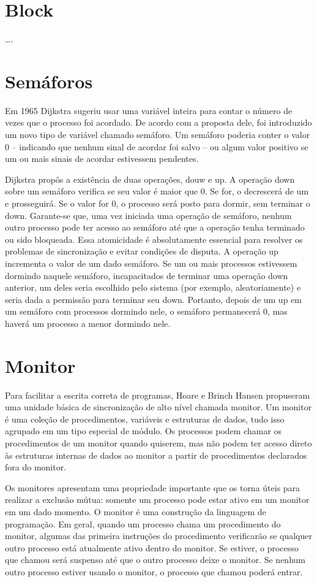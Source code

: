 \section{Block}
….


\section{Semáforos}

Em 1965 Dijkstra sugeriu usar uma variável inteira para contar o número de vezes que o processo foi acordado. De acordo com a proposta dele, foi introduzido um novo tipo de variável chamado semáforo. Um semáforo poderia conter o valor 0 – indicando que nenhum sinal de acordar foi salvo – ou algum valor positivo se um ou mais sinais de acordar estivessem pendentes.

Dijkstra propôs a existência de duas operações,  douw e up. A operação down sobre um semáforo verifica se seu valor é maior que 0. Se for, o decrescerá de um e prosseguirá. Se o valor for 0, o processo será posto para dormir, sem terminar o down. Garante-se que, uma vez iniciada uma operação de semáforo, nenhum outro processo pode ter acesso ao semáforo até que a operação tenha terminado ou sido bloqueada. Essa atomicidade é absolutamente essencial para resolver os problemas de sincronização e evitar condições de disputa.
A operação up incrementa o valor de um dado semáforo. Se um ou mais processos estivessem dormindo naquele semáforo, incapacitados de terminar uma operação down anterior, um deles seria escolhido pelo sistema (por exemplo, aleatoriamente) e seria dada a permissão para terminar seu down. Portanto, depois de um up em um semáforo com processos dormindo nele, o semáforo permanecerá 0, mas haverá um processo a menor dormindo nele.

\section{Monitor}

Para facilitar a escrita correta de programas, Hoare e Brinch Hansen propuseram uma unidade básica de sincronização de alto nível chamada monitor.  Um monitor é uma coleção de procedimentos, variáveis e estruturas de dados, tudo isso agrupado em um tipo especial de módulo. Os processos podem chamar os procedimentos de um monitor quando quiserem, mas não podem ter acesso direto às estruturas internas de dados ao monitor a partir de procedimentos declarados fora do monitor.

Os monitores apresentam uma propriedade importante que os torna úteis para realizar a exclusão mútua: somente um processo pode estar ativo em um monitor em um dado momento. O monitor é uma construção da linguagem de programação. Em geral, quando um processo chama um procedimento do monitor, algumas das primeira instruções do procedimento verificarão  se qualquer outro processo está atualmente ativo dentro do monitor. Se estiver, o processo que chamou será suspenso até que o outro processo deixe o monitor. Se nenhum outro processo estiver usando o monitor, o processo que chamou poderá entrar.


